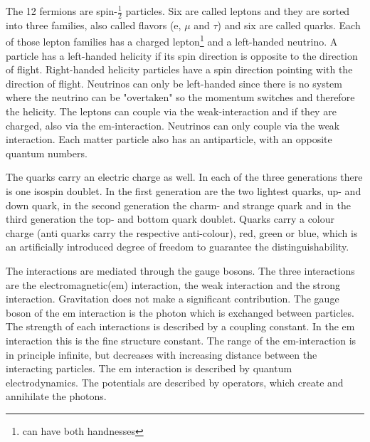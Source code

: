 The 12 fermions are spin-$\frac{1}{2}$ particles. Six are called leptons and they are sorted into three families, also called flavors (e, $\mu$ and $\tau$) and six are called quarks. Each of those lepton families has a charged lepton\footnote{can have both handnesses} and a left-handed neutrino.
A particle has a left-handed helicity if its spin direction is opposite to the direction of flight. Right-handed helicity particles have a spin direction pointing with the direction of flight.
Neutrinos can only be left-handed since there is no system where the neutrino can be "overtaken" so the momentum switches and therefore the helicity.
The leptons can couple via the weak-interaction and if they are charged, also via the em-interaction. Neutrinos can only couple via the weak interaction.
Each matter particle also has an antiparticle, with an opposite quantum numbers.

The quarks carry an electric charge as well. In each of the three generations there is one isospin doublet. In the first generation are the two lightest quarks,
up- and down quark, in the second generation the charm- and strange quark and
in the third generation the top- and bottom quark doublet.
Quarks carry a colour charge (anti quarks carry the respective anti-colour), red, green or blue, which is an artificially introduced degree of freedom to guarantee the distinguishability.

The interactions are mediated through the gauge bosons.
The three interactions are the electromagnetic(em) interaction,
the weak interaction and the strong interaction. Gravitation does not make a significant contribution.
The gauge boson of the em interaction is the photon which is exchanged between particles.
The strength of each interactions is
described by a coupling constant. In the em interaction this is the
fine structure constant\cite{alphas}. The range of the em-interaction is in principle
infinite, but decreases with increasing distance between the interacting particles.
The em interaction is described by quantum electrodynamics.
The potentials are described by operators, which create and annihilate the photons.

